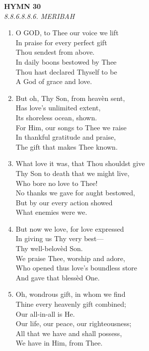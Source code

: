 \documentclass[11pt,a4paper]{article}
\begin{document}
\newpage
\begin{center}
    {\Large \textbf{HYMN 30}}
    \\
    \textit{8.8.6.8.8.6. MERIBAH}
\end{center}
\vspace{1em}

\begin{enumerate}
    \item O GOD, to Thee our voice we lift \\
        In praise for every perfect gift \\
        Thou sendest from above. \\
        In daily boons bestowed by Thee \\
        Thou hast declared Thyself to be \\
        A God of grace and love.

    \item But oh, Thy Son, from heav\`en sent, \\
        Has love's unlimited extent, \\
        Its shoreless ocean, shown. \\
        For Him, our songs to Thee we raise \\
        In thankful gratitude and praise, \\
        The gift that makes Thee known.

    \item What love it was, that Thou shouldst give \\
        Thy Son to death that we might live, \\
        Who bore no love to Thee! \\
        No thanks we gave for aught bestowed, \\
        But by our every action showed \\
        What enemies were we.

    \item But now we love, for love expressed \\
        In giving us Thy very best--- \\
        Thy well-belov\`ed Son. \\
        We praise Thee, worship and adore, \\
        Who opened thus love's boundless store \\
        And gave that bless\`ed One.

    \item Oh, wondrous gift, in whom we find \\
        Thine every heavenly gift combined; \\
        Our all-in-all is He. \\
        Our life, our peace, our righteousness; \\
        All that we have and shall possess, \\
        We have in Him, from Thee.


\end{enumerate}
\end{document}
